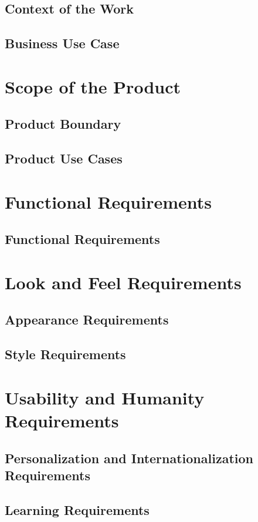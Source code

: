 \documentclass[paper=letter, fontsize=10pt]{scrartcl}
\numberwithin{equation}{section}		%
\numberwithin{figure}{section}			%
\numberwithin{table}{section}				%
\begin{document}
\subsection{Context of the Work}
\subsection{Business Use Case}

\section{Scope of the Product}
\subsection{Product Boundary}
\subsection{Product Use Cases}

\section{Functional Requirements}
\subsection{Functional Requirements}

\section{Look and Feel Requirements}
\subsection{Appearance Requirements}
\subsection{Style Requirements}

\section{Usability and Humanity Requirements}
\subsection{Personalization and Internationalization Requirements}
\subsection{Learning Requirements}
\end{document}
